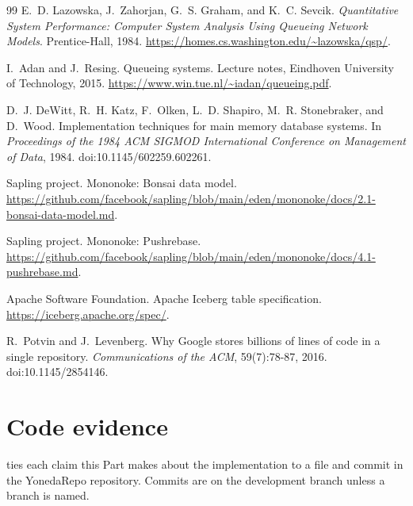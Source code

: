 \documentclass[11pt,letterpaper]{article}
\theoremstyle{definition}
\theoremstyle{remark}
\begin{document}
\begin{thebibliography}{99}
E.~D. Lazowska, J.~Zahorjan, G.~S. Graham, and K.~C. Sevcik.
\newblock \emph{Quantitative System Performance: Computer System Analysis Using Queueing Network Models}.
\newblock Prentice-Hall, 1984.
\newblock \url{https://homes.cs.washington.edu/~lazowska/qsp/}.

I.~Adan and J.~Resing.
\newblock Queueing systems.
\newblock Lecture notes, Eindhoven University of Technology, 2015.
\newblock \url{https://www.win.tue.nl/~iadan/queueing.pdf}.

D.~J. DeWitt, R.~H. Katz, F.~Olken, L.~D. Shapiro, M.~R. Stonebraker, and D.~Wood.
\newblock Implementation techniques for main memory database systems.
\newblock In \emph{Proceedings of the 1984 ACM SIGMOD International Conference on Management of Data}, 1984.
\newblock doi:10.1145/602259.602261.

Sapling project.
\newblock Mononoke: Bonsai data model.
\newblock \url{https://github.com/facebook/sapling/blob/main/eden/mononoke/docs/2.1-bonsai-data-model.md}.

Sapling project.
\newblock Mononoke: Pushrebase.
\newblock \url{https://github.com/facebook/sapling/blob/main/eden/mononoke/docs/4.1-pushrebase.md}.

Apache Software Foundation.
\newblock Apache Iceberg table specification.
\newblock \url{https://iceberg.apache.org/spec/}.

R.~Potvin and J.~Levenberg.
\newblock Why {Google} stores billions of lines of code in a single repository.
\newblock \emph{Communications of the ACM}, 59(7):78-87, 2016.
\newblock doi:10.1145/2854146.

\end{thebibliography}

\appendix

\section{Code evidence}
\label{app:sgoc:evidence}

 ties each claim this Part makes about the implementation to a file and commit in the YonedaRepo repository. Commits are on the development branch unless a branch is named.
\end{document}

